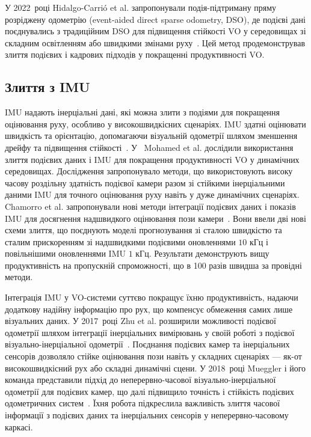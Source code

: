 У 2022~році Hidalgo-Carrió et al. запропонували подія-підтриману пряму розріджену одометрію (event-aided direct sparse odometry, DSO), де подієві дані поєднувались з традиційним DSO для підвищення стійкості VO у середовищах зі складним освітленням або швидкими змінами руху~\cite{Hidalgo-Carrio_2022_CVPR}. Цей метод продемонстрував злиття подієвих і кадрових підходів у покращенні продуктивності VO.

\subsection{Злиття з IMU}
IMU надають інерціальні дані, які можна злити з подіями для покращення оцінювання руху, особливо у високошвидкісних сценаріях. IMU здатні оцінювати швидкість та орієнтацію, допомагаючи візуальній одометрії шляхом зменшення дрейфу та підвищення стійкості~\cite{scaramuzza2019visual}. У~\cite{mohamed2020towards} Mohamed et al. дослідили використання злиття подієвих даних і IMU для покращення продуктивності VO у динамічних середовищах. Дослідження запропонувало методи, що використовують високу часову роздільну здатність подієвої камери разом зі стійкими інерціальними даними IMU для точного оцінювання руху навіть у дуже динамічних сценаріях.
Chamorro et al. запропонували нові методи інтеграції подієвих даних і показів IMU для досягнення надшвидкого оцінювання пози камери~\cite{Chamorro_2023_CVPR}. Вони ввели дві нові схеми злиття, що поєднують моделі прогнозування зі сталою швидкістю та сталим прискоренням зі надшвидкими подієвими оновленнями \(10\) кГц і повільнішими оновленнями IMU \(1\) кГц. Результати демонструють вищу продуктивність на пропускній спроможності, що в 100 разів швидша за провідні методи.

Інтеграція IMU у VO-системи суттєво покращує їхню продуктивність, надаючи додаткову надійну інформацію про рух, що компенсує обмеження самих лише візуальних даних.
У 2017~році Zhu et al. розширили можливості подієвої одометрії шляхом інтеграції інерціальних вимірювань у своїй роботі з подієвої візуально-інерціальної одометрії~\cite{Zhu_2017_CVPR}. Поєднання подієвих камер та інерціальних сенсорів дозволяло стійке оцінювання пози навіть у складних сценаріях — як-от високошвидкісний рух або складні динамічні сцени.
У 2018~році Mueggler і його команда представили підхід до неперервно-часової візуально-інерціальної одометрії для подієвих камер, що далі підвищило точність і стійкість подієвих одометричних систем~\cite{mueggler2018continuous}. Їхня робота підкреслила важливість злиття часової інформації з подієвих даних та інерціальних сенсорів у неперервно-часовому каркасі.


